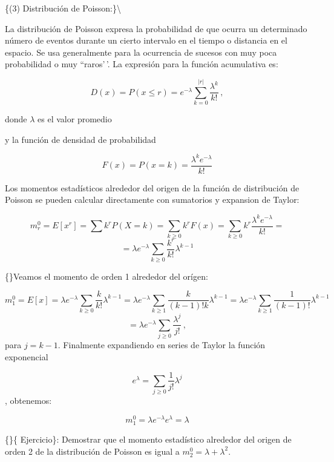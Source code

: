 \documentclass[
]{agujournal2019}
\begin{document}
\vspace{0.5cm}

\{\noindent  (3) Distribución de Poisson:\}\textbackslash{}

La distribución de Poisson expresa la probabilidad de que ocurra un
determinado número de eventos durante un cierto intervalo en el tiempo o
distancia en el espacio. Se usa generalmente para la ocurrencia de
sucesos con muy poca probabilidad o muy ``raros'\,'. La expresión para
la función acumulativa es:

\[D(x)=P(x \le r)=e^{-\lambda}\sum^{|r|}_{k=0}\frac{\lambda^k}{k!}\,,\]

donde \(\lambda\) es el valor promedio

\begin{center}
\end{center}

y la función de densidad de probabilidad

\[F(x)=P(x=k)=\frac{{\lambda}^k e^{-\lambda}}{k!}\]

\begin{center}
\end{center}

Los momentos estadísticos alrededor del origen de la función de
distribución de Poisson se pueden calcular directamente con sumatorios y
expansion de Taylor:

\[m^0_r=E[x^r]=\sum k^r P(X=k)=\sum_{k\ge0} k^rF(x)= \sum_{k\ge0} k^r\frac{{\lambda}^k e^{-\lambda}}{k!}=\]
\[=\lambda e^{-\lambda}\sum_{k \ge 0}\frac{k^r}{k!}\lambda^{k-1}\]

\{\noindent\}Veamos el momento de orden 1 alrededor del orígen:

\[m^0_1=E[x]=\lambda e^{-\lambda}\sum_{k \ge 0}\frac{k}{k!}\lambda^{k-1}=
 \lambda e^{-\lambda}\sum_{k \ge 1}\frac{k}{(k-1)!k}\lambda^{k-1}=
 \lambda e^{-\lambda}\sum_{k \ge 1}\frac{1}{(k-1)!}\lambda^{k-1}\]
\[=\lambda e^{-\lambda}\sum_{j \ge 0}\frac{\lambda^{j}}{j!}\,,\] para
\(j=k-1\). Finalmente expandiendo en series de Taylor la función
exponencial

\[e^{\lambda}=\sum_{j \ge 0}\frac{1}{j!}\lambda^{j}\], obtenemos:

\[m^0_1=\lambda e^{-\lambda}e^{\lambda}=\lambda\]

\{\noindent\}\{ Ejercicio\}: Demostrar que el momento estadístico
alrededor del origen de orden 2 de la distribución de Poisson es igual a
\(m^0_2=\lambda+\lambda^2\).
\end{document}
